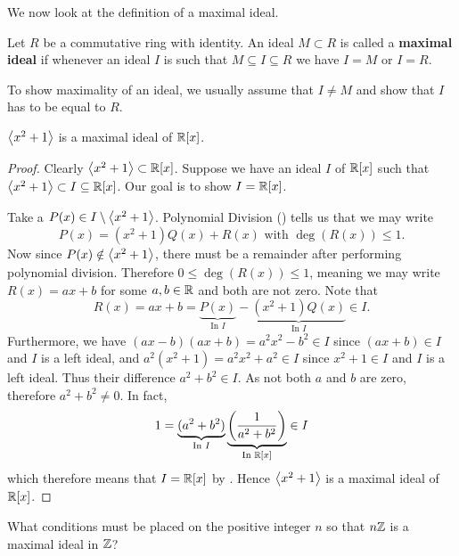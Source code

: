 We now look at the definition of a maximal ideal.
\begin{definition}
    Let $R$ be a commutative ring with identity. An ideal $M \subset R$ is called a \textbf{maximal ideal} if whenever an ideal $I$ is such that $M \subseteq I \subseteq R$ we have $I = M$ or $I = R$.
\end{definition}
\begin{remark}
    To show maximality of an ideal, we usually assume that $I \neq M$ and show that $I$ has to be equal to $R$.
\end{remark}
\begin{proposition}
    $\left\langle x^2 + 1\right\rangle$ is a maximal ideal of $\mathbb{R}[x]$.
\end{proposition}
\begin{proof}
    Clearly $\left\langle x^2 + 1\right\rangle \subset \mathbb{R}[x]$. Suppose we have an ideal $I$ of $\mathbb{R}[x]$ such that $\left\langle x^2 + 1\right\rangle \subset I \subseteq \mathbb{R}[x]$. Our goal is to show $I = \mathbb{R}[x]$.

    Take a $P(x) \in I \setminus \left\langle x^2 + 1\right\rangle$. Polynomial Division () tells us that we may write
    \[
        P(x) = (x^2+1)Q(x) + R(x) \text{ with } \deg(R(x)) \leq 1.
    \]
    Now since $P(x) \notin \left\langle x^2 + 1\right\rangle$, there must be a remainder after performing polynomial division. Therefore $0 \leq \deg(R(x)) \leq 1$, meaning we may write $R(x) = ax + b$ for some $a,b \in \mathbb{R}$ and both are not zero. Note that
    \[
        R(x) = ax + b = \underbrace{P(x)}_{\text{In }I} - \underbrace{(x^2+1)Q(x)}_{\text{In }I} \in I.
    \]
    Furthermore, we have $(ax-b)(ax+b) = a^2x^2 - b^2 \in I$ since $(ax+b) \in I$ and $I$ is a left ideal, and $a^2(x^2+1) = a^2x^2 + a^2 \in I$ since $x^2+1 \in I$ and $I$ is a left ideal. Thus their difference $a^2 + b^2 \in I$. As not both $a$ and $b$ are zero, therefore $a^2 + b^2 \neq 0$. In fact,
    \[
        1 = \underbrace{(a^2+b^2)}_{\text{In }I}\underbrace{\left(\frac1{a^2+b^2}\right)}_{\text{In }\mathbb{R}[x]} \in I
    \]
    which therefore means that $I = \mathbb{R}[x]$ by . Hence $\left\langle x^2 + 1\right\rangle$ is a maximal ideal of $\mathbb{R}[x]$.
\end{proof}
\begin{exercise}
    What conditions must be placed on the positive integer $n$ so that $n\mathbb{Z}$ is a maximal ideal in $\mathbb{Z}$?
\end{exercise}

